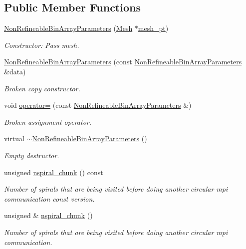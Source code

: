 \subsection*{Public Member Functions}
\begin{DoxyCompactItemize}
\item 
\hyperlink{classoomph_1_1NonRefineableBinArrayParameters_a9dd0d9a3ee86b493d7944efe943ed419}{Non\+Refineable\+Bin\+Array\+Parameters} (\hyperlink{classoomph_1_1Mesh}{Mesh} $\ast$\hyperlink{classoomph_1_1SamplePointContainerParameters_a92bcab955d47e99d47b601253da7b6b2}{mesh\+\_\+pt})
\begin{DoxyCompactList}\small\item\em Constructor\+: Pass mesh. \end{DoxyCompactList}\item 
\hyperlink{classoomph_1_1NonRefineableBinArrayParameters_a3f9bc402be8e192190f62927947d135f}{Non\+Refineable\+Bin\+Array\+Parameters} (const \hyperlink{classoomph_1_1NonRefineableBinArrayParameters}{Non\+Refineable\+Bin\+Array\+Parameters} \&data)
\begin{DoxyCompactList}\small\item\em Broken copy constructor. \end{DoxyCompactList}\item 
void \hyperlink{classoomph_1_1NonRefineableBinArrayParameters_a983009919c352b06ca15fd32169b10e6}{operator=} (const \hyperlink{classoomph_1_1NonRefineableBinArrayParameters}{Non\+Refineable\+Bin\+Array\+Parameters} \&)
\begin{DoxyCompactList}\small\item\em Broken assignment operator. \end{DoxyCompactList}\item 
virtual \hyperlink{classoomph_1_1NonRefineableBinArrayParameters_a377a6754b51d9e2129f301509ae6353a}{$\sim$\+Non\+Refineable\+Bin\+Array\+Parameters} ()
\begin{DoxyCompactList}\small\item\em Empty destructor. \end{DoxyCompactList}\item 
unsigned \hyperlink{classoomph_1_1NonRefineableBinArrayParameters_adfaea5d556a6e9fa5b9b874039ddc069}{nspiral\+\_\+chunk} () const
\begin{DoxyCompactList}\small\item\em Number of spirals that are being visited before doing another circular mpi communication const version. \end{DoxyCompactList}\item 
unsigned \& \hyperlink{classoomph_1_1NonRefineableBinArrayParameters_a8815febdad327ff6c39d7e0c5e470033}{nspiral\+\_\+chunk} ()
\begin{DoxyCompactList}\small\item\em Number of spirals that are being visited before doing another circular mpi communication. \end{DoxyCompactList}\end{DoxyCompactItemize}
